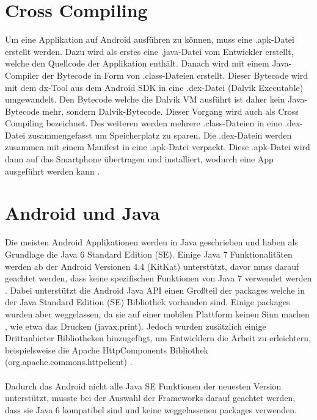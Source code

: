 \section{Cross Compiling}
Um eine Applikation auf Android ausführen zu können, muss eine .apk-Datei erstellt werden. Dazu wird als erstes eine .java-Datei vom Entwickler erstellt, welche den Quellcode der Applikation enthält. Danach wird mit einem Java-Compiler der Bytecode in Form von .class-Dateien erstellt. Dieser Bytecode wird mit dem dx-Tool aus dem Android SDK in eine .dex-Datei (Dalvik Executable) umgewandelt. Den Bytecode welche die Dalvik VM ausführt ist daher kein Java-Bytecode mehr, sondern Dalvik-Bytecode. Dieser Vorgang wird auch als Cross Compiling bezeichnet. Des weiteren werden mehrere .class-Dateien in eine .dex-Datei zusammengefasst um Speicherplatz zu sparen. Die .dex-Datein werden zusammen mit einem Manifest in eine .apk-Datei verpackt. Diese .apk-Datei wird dann auf das Smartphone übertragen und installiert, wodurch eine App ausgeführt werden kann \cite{unterschied:dirscherl}.	

\section{Android und Java}
Die meisten Android Applikationen werden in Java geschrieben und haben als Grundlage die Java 6 Standard Edition (SE). Einige Java 7 Funktionalitäten werden ab der Android Versionen 4.4 (KitKat) unterstützt, davor muss darauf geachtet werden, dass keine spezifischen Funktionen von Java 7 verwendet werden \cite{android:burnette}. Dabei unterstützt die Android Java API einen Großteil der packages welche in der Java Standard Edition (SE) Bibliothek vorhanden sind. Einige packages wurden aber weggelassen, da sie auf einer mobilen Plattform keinen Sinn machen \cite{implemenationSDK}, wie etwa das Drucken (javax.print). Jedoch wurden zusätzlich einige Drittanbieter Bibliotheken hinzugefügt, um Entwicklern die Arbeit zu erleichtern, beispielsweise die Apache HttpComponents Bibliothek (org.apache.commons.httpclient) \cite{android:libs}. 
\\\\	
Dadurch das Android nicht alle Java SE Funktionen der neuesten Version unterstützt, musste bei der Auswahl der Frameworks darauf geachtet werden, dass sie Java 6 kompatibel sind und keine weggelassenen packages verwenden.	

	
	
